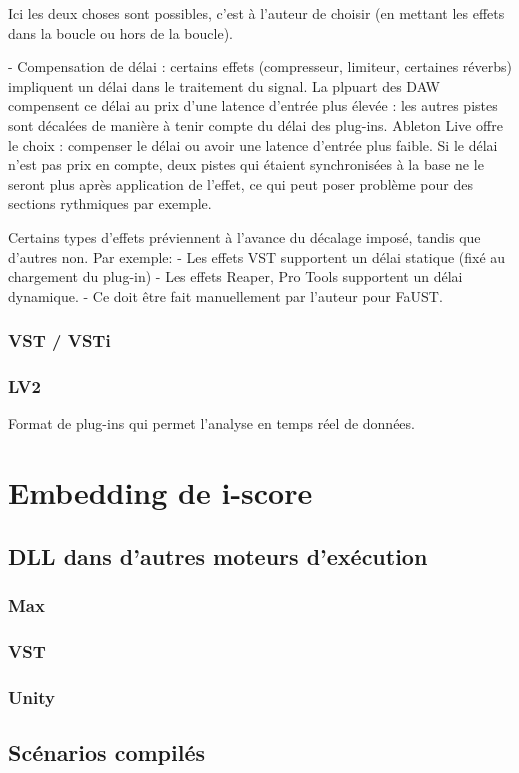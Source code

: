 \documentclass[french,a4paper,openany,12pt]{book}
\begin{document}
Ici les deux choses sont possibles, c'est à l'auteur de choisir 
(en mettant les effets dans la boucle ou hors de la boucle).

- Compensation de délai : certains effets (compresseur, limiteur, certaines réverbs) impliquent 
un délai dans le traitement du signal.
La plpuart des DAW compensent ce délai au prix d'une latence d'entrée plus élevée : les autres 
pistes sont décalées de manière à tenir compte du délai des plug-ins.
Ableton Live offre le choix : compenser le délai ou avoir une latence d'entrée plus faible.
Si le délai n'est pas prix en compte, deux pistes qui étaient synchronisées à la base ne le seront plus 
après application de l'effet, ce qui peut poser problème pour des sections rythmiques par exemple.

Certains types d'effets préviennent à l'avance du décalage imposé, tandis que d'autres non.
Par exemple:
- Les effets VST supportent un délai statique (fixé au chargement du plug-in)
- Les effets Reaper, Pro Tools supportent un délai dynamique.
- Ce doit être fait manuellement par l'auteur pour FaUST.


\subsubsection{VST / VSTi}
\subsubsection{LV2}
Format de plug-ins qui permet l'analyse en temps réel de données.

\section{Embedding de i-score}
\subsection{DLL dans d'autres moteurs d'exécution}
\subsubsection{Max}
\subsubsection{VST}
\subsubsection{Unity}
\subsection{Scénarios compilés}
\end{document}
